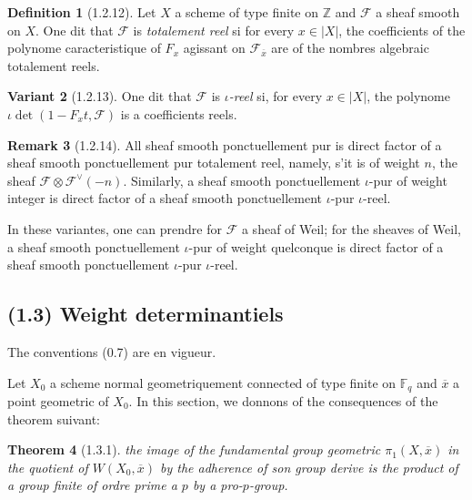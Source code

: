 \documentclass[12pt,a4paper]{article}
\theoremstyle{plain}
\newtheorem{theorem}{Theorem}[section]
\theoremstyle{definition}
\newtheorem{definition}[theorem]{Definition}
\newtheorem{remark}[theorem]{Remark}
\newtheorem{var}[theorem]{Variant}
\theoremstyle{definition}
\theoremstyle{remark}
\begin{document}
\begin{definition}[1.2.12]
Let $X$ a scheme of type finite on $\mathbb{Z}$ and $\mathscr{F}$ a sheaf smooth on $X$. One dit that $\mathscr{F}$ is \emph{totalement reel} si for every $x \in |X|$, the coefficients of the polynome caracteristique of $F_x$ agissant on $\mathscr{F}_{\overline{x}}$ are of the nombres algebraic totalement reels.
\end{definition}

\begin{var}[1.2.13]
One dit that $\mathscr{F}$ is \emph{$\iota$-reel} si, for every $x \in |X|$, the polynome $\iota\det(1 - F_x t, \mathscr{F})$ is a coefficients reels.
\end{var}

\begin{remark}[1.2.14]
All sheaf smooth ponctuellement pur is direct factor of a sheaf smooth ponctuellement pur totalement reel, namely, s'it is of weight $n$, the sheaf $\mathscr{F} \otimes \mathscr{F}^\vee(-n)$. Similarly, a sheaf smooth ponctuellement $\iota$-pur of weight integer is direct factor of a sheaf smooth ponctuellement $\iota$-pur $\iota$-reel.

In these variantes, one can prendre for $\mathscr{F}$ a sheaf of Weil; for the sheaves of Weil, a sheaf smooth ponctuellement $\iota$-pur of weight quelconque is direct factor of a sheaf smooth ponctuellement $\iota$-pur $\iota$-reel.
\end{remark}

\newpage

\subsection*{(1.3) Weight determinantiels}

The conventions (0.7) are en vigueur.

Let $X_0$ a scheme normal geometriquement connected of type finite on $\mathbb{F}_q$ and $\overline{x}$ a point geometric of $X_0$. In this section, we donnons of the consequences of the theorem suivant:

\begin{theorem}[1.3.1]
the image of the fundamental group geometric $\pi_1(X, \overline{x})$ in the quotient of $W(X_0, \overline{x})$ by the adherence of son group derive is the product of a group finite of ordre prime a $p$ by a pro-$p$-group.
\end{theorem}
\end{document}
